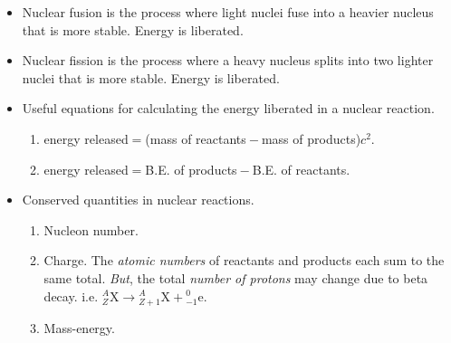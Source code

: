\documentclass[oneside]{book}
\begin{document}
\begin{minipage}{0.5\textwidth}
    \begin{itemize}
        \item Nuclear fusion is the process where light nuclei fuse into a heavier nucleus that is more stable. Energy is liberated.
        \item Nuclear fission is the process where a heavy nucleus splits into two lighter nuclei that is more stable. Energy is liberated.
        \item Useful equations for calculating the energy liberated in a nuclear reaction. 
        \begin{enumerate}
            \item energy released\({}={}\)(mass of reactants\({}-{}\)mass of products)\({}c^2\).
            \item energy released\({}={}\)B.E. of products\({}-{}\)B.E. of reactants.
        \end{enumerate}
        \item Conserved quantities in nuclear reactions.
        \begin{enumerate}
            \item Nucleon number.
            \item Charge. The \emph{atomic numbers} of reactants and products each sum to the same total. \emph{But}, the total \emph{number of protons} may change due to beta decay. i.e. 
            \(_Z^A\text{X}\to{}_{Z+1}^A\text{X}+{}_{-1}^0\text{e}\).
            \item Mass-energy.
        \end{enumerate}
    \end{itemize}
\end{minipage}
\end{document}
